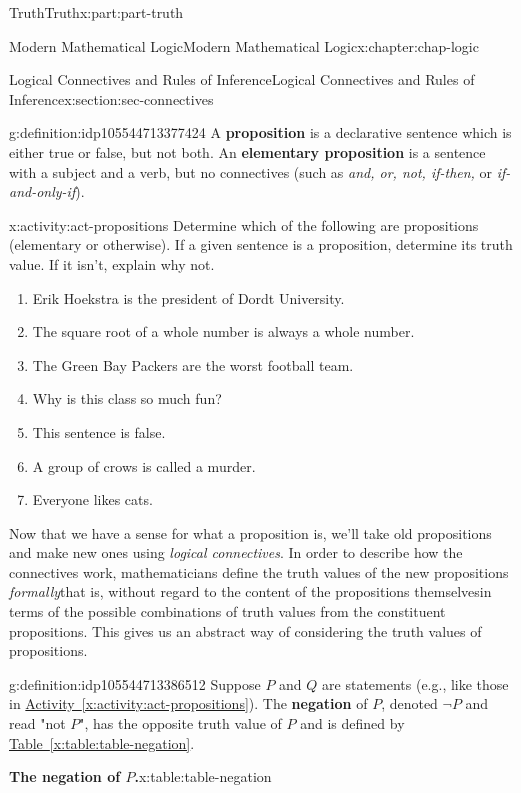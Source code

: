 \documentclass[oneside,10pt,]{book}
\newcommand{\tabularfont}{\relax}
\newcommand{\xreffont}{\relax}
\newcommand{\terminology}[1]{\textbf{#1}}
\numberwithin{equation}{section}
\begin{document}
\begin{partptx}{Truth}{}{Truth}{}{}{x:part:part-truth}
\begin{chapterptx}{Modern Mathematical Logic}{}{Modern Mathematical Logic}{}{}{x:chapter:chap-logic}
\begin{sectionptx}{Logical Connectives and Rules of Inference}{}{Logical Connectives and Rules of Inference}{}{}{x:section:sec-connectives}
\begin{definition}{}{g:definition:idp105544713377424}
A \terminology{proposition} is a declarative sentence which is either true or false, but not both. An \terminology{elementary proposition} is a sentence with a subject and a verb, but no connectives (such as \emph{and, or, not, if-then,} or \emph{if-and-only-if}).%
\end{definition}
\begin{activity}{}{x:activity:act-propositions}%
Determine which of the following are propositions (elementary or otherwise). If a given sentence is a proposition, determine its truth value. If it isn't, explain why not.%
%
\begin{enumerate}
\item{}Erik Hoekstra is the president of Dordt University.%
\item{}The square root of a whole number is always a whole number.%
\item{}The Green Bay Packers are the worst football team.%
\item{}Why is this class so much fun?%
\item{}This sentence is false.%
\item{}A group of crows is called a murder.%
\item{}Everyone likes cats.%
\end{enumerate}
\end{activity}%
Now that we have a sense for what a proposition is, we'll take old propositions and make new ones using \emph{logical connectives}. In order to describe how the connectives work, mathematicians define the truth values of the new propositions \emph{formally}\textemdash{}that is, without regard to the content of the propositions themselves\textemdash{}in terms of the possible combinations of truth values from the constituent propositions. This gives us an abstract way of considering the truth values of propositions.%
\begin{definition}{}{g:definition:idp105544713386512}%
%
%
Suppose \(P\) and \(Q\) are statements (e.g., like those in \hyperref[x:activity:act-propositions]{Activity~{\xreffont\ref{x:activity:act-propositions}}}). The \terminology{negation} of \(P\), denoted \(\neg P\) and read "not \(P\)", has the opposite truth value of \(P\) and is defined by \hyperref[x:table:table-negation]{Table~{\xreffont\ref{x:table:table-negation}}}.%
\begin{tableptx}{\textbf{The negation of \(P\).}}{x:table:table-negation}{}%
\centering%
{\tabularfont%
\begin{tabular}{cc}

\end{tabular}}
\end{tableptx}
\end{definition}
\end{sectionptx}
\end{chapterptx}
\end{partptx}
\end{document}
